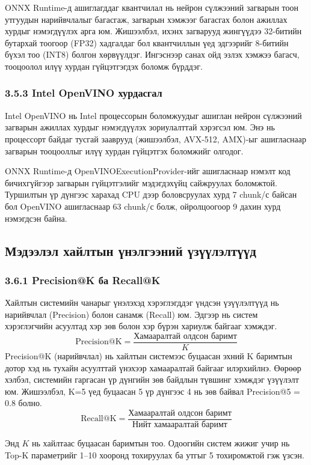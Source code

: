 \documentclass[11pt,a4paper]{article}
\begin{document}
ONNX Runtime-д ашиглагддаг квантчилал нь нейрон сүлжээний загварын тоон утгуудын нарийвчлалыг багасгаж, загварын хэмжээг багасгах болон ажиллах хурдыг нэмэгдүүлэх арга юм. Жишээлбэл, ихэнх загварууд жингүүдээ 32-битийн бутархай тоогоор (FP32) хадгалдаг бол квантчиллын үед эдгээрийг 8-битийн бүхэл тоо (INT8) болгон хөрвүүлдэг. Ингэснээр санах ойд эзлэх хэмжээ багасч, тооцоолол илүү хурдан гүйцэтгэгдэх боломж бүрддэг.
\subsubsection*{3.5.3 Intel OpenVINO хурдасгал}

Intel OpenVINO нь Intel процессорын боломжуудыг ашиглан нейрон сүлжээний загварын ажиллах хурдыг нэмэгдүүлэх зориулалттай хэрэгсэл юм. Энэ нь процессорт байдаг тусгай зааврууд (жишээлбэл, AVX-512, AMX)-ыг ашигласнаар загварын тооцооллыг илүү хурдан гүйцэтгэх боломжийг олгодог.

ONNX Runtime-д OpenVINOExecutionProvider-ийг ашигласнаар нэмэлт код бичихгүйгээр загварын гүйцэтгэлийг мэдэгдэхүйц сайжруулах боломжтой. Туршилтын үр дүнгээс харахад CPU дээр боловсруулах хурд 7 chunk/с байсан бол OpenVINO ашигласнаар 63 chunk/с болж, ойролцоогоор 9 дахин хурд нэмэгдсэн байна.
\subsection{Мэдээлэл хайлтын үнэлгээний үзүүлэлтүүд}

\subsubsection*{3.6.1 Precision@K ба Recall@K}

Хайлтын системийн чанарыг үнэлэхэд хэрэглэгддэг үндсэн үзүүлэлтүүд нь нарийвчлал (Precision) болон санамж (Recall) юм. Эдгээр нь систем хэрэглэгчийн асуултад хэр зөв болон хэр бүрэн хариулж байгааг хэмждэг.
\[
  \text{Precision@K} = \frac{\text{Хамааралтай олдсон баримт}}{K}
\]
Precision@K (нарийвчлал) нь хайлтын системээс буцаасан эхний K баримтын дотор хэд нь тухайн асуулттай үнэхээр хамааралтай байгааг илэрхийлнэ. Өөрөөр хэлбэл, системийн гаргасан үр дүнгийн зөв байдлын түвшинг хэмждэг үзүүлэлт юм. Жишээлбэл, K=5 үед буцаасан 5 үр дүнгээс 4 нь зөв байвал Precision@5 = 0.8 болно.
\[
  \text{Recall@K} = \frac{\text{Хамааралтай олдсон баримт}}{\text{Нийт хамааралтай баримт}}
\]

Энд $K$ нь хайлтаас буцаасан баримтын тоо. Одоогийн систем жижиг учир нь Top-K параметрийг 1--10 хооронд тохируулах ба утгыг 5 тохиромжтой гэж үзсэн.  
\end{document}
